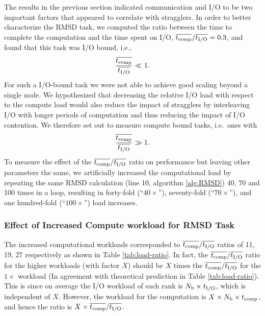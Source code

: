 The results in the previous section indicated communication and I/O to be two important factors that appeared to correlate with stragglers. 
In order to better characterize the RMSD task, we computed the ratio between the time to complete the computation and the time spent on I/O, $\overline{{t}_{\text{comp}}}/\overline{{t}_{\text{I/O}}} = 0.3$, and found that this task was I/O bound, i.e.,
\begin{gather*}
  \frac{\overline{{t}_{\text{comp}}}}{\overline{{t}_{\text{I/O}}}} \ll 1.
\end{gather*}
For such a I/O-bound task we were not able to achieve good scaling beyond a single node. 
We hypothesized that decreasing the relative I/O load with respect to the compute load would also reduce the impact of stragglers by interleaving I/O with longer periods of computation and thus reducing the impact of I/O contention.
We therefore set out to measure compute bound tasks, i.e.\ ones with
\begin{gather*}
  \frac{\overline{{t}_{\text{comp}}}}{\overline{{t}_{\text{I/O}}}} \gg 1.
\end{gather*}
To measure the effect of the $\overline{{t}_{\text{comp}}}/\overline{{t}_{\text{I/O}}}$ ratio on performance but leaving other parameters the same, we artificially increased the computational load by repeating the same RMSD calculation (line 10, algorithm \ref{alg:RMSD}) 40, 70 and 100 times in a loop, resulting in forty-fold (``$40\times$''), seventy-fold (``$70\times$''), and one hundred-fold (``$100\times$'') load increases.

\subsubsection{Effect of Increased Compute workload for RMSD Task}

The increased computational workloads corresponded to $\overline{{t}_{\text{comp}}}/\overline{{t}_{\text{I/O}}}$ ratios of 11, 19, 27 respectively as shown in Table \ref{tab:load-ratio}.
In fact, the $\overline{{t}_{\text{comp}}}/\overline{{t}_{\text{I/O}}}$ ratio for the higher workloads (with factor $X$) should be $X$ times the $\overline{{t}_{\text{comp}}}/\overline{{t}_{\text{I/O}}}$ for the $1\times$ workload (In agreement with theoretical prediction in Table \ref{tab:load-ratio}).
This is since on average the I/O workload of each rank is $N_{\text{b}} \times {t}_{\text{I/O}} $, which is independent of $X$. 
However, the workload for the computation is $X \times N_{\text{b}} \times {t}_{\text{comp}}$, and hence the ratio is $X \times \overline{{t}_{\text{comp}}}/\overline{{t}_{\text{I/O}}}$.


